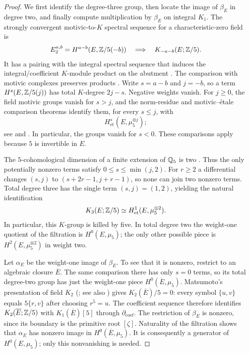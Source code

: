 \begin{proof}
We first identify the degree-three group, then locate the image of
$\beta_E$ in degree two, and finally compute multiplication by
$\beta_E$ on integral $K_1$. The strongly convergent motivic-to-$K$
spectral sequence for a characteristic-zero field is
\begin{equation}\label{eq:motivic}
 E_2^{a,b}=H^{a-b}(E,\mathbb Z/5(-b))
 \quad\Longrightarrow\quad K_{-a-b}(E;\mathbb Z/5).
\end{equation}
It has a pairing with the integral spectral sequence that induces
the integral/coefficient $K$-module product on the abutment
\cite[Theorem 16.2 and Appendix C.2--C.3]{FriedlanderSuslin}.
The comparison with motivic complexes preserves products
\cite[Lemma 3.4 and Theorem 6.1]{Suslin}.
Write $s=a-b$ and $j=-b$, so a term $H^s(E,\mathbb Z/5(j))$ has total
$K$-degree $2j-s$. Negative weights vanish. For $j\geq0$, the
field motivic groups vanish for $s>j$, and the norm-residue and
motivic--\'etale comparison theorems identify them, for every
$s\leq j$, with
\[
 H^s_{\mathrm{et}}(E,\mu_5^{\otimes j});
\]
see \cite[Theorems 6.16--6.17]{Voevodsky} and
\cite[VI.4.1--4.2]{Weibel}. In particular, the groups vanish for
$s<0$. These comparisons apply because $5$ is invertible in $E$.

The $5$-cohomological dimension of a finite extension of $\mathbb Q_5$
is two \cite[VI.\S7, before Proposition 7.3]{Weibel}. Thus the
only potentially nonzero terms satisfy $0\leq s\leq\min(j,2)$.
For $r\geq2$ a differential changes $(s,j)$ to
$(s+2r-1,j+r-1)$, so none can join two nonzero terms. Total
degree three has the single term $(s,j)=(1,2)$, yielding the
natural identification
\begin{equation}\label{eq:degree-three-edge}
 K_3(E;\mathbb Z/5)\simeq H^1_{\mathrm{et}}(E,\mu_5^{\otimes2}).
\end{equation}
In particular, this $K$-group is killed by five. In total degree
two the weight-one quotient of the filtration is $H^0(E,\mu_5)$;
the only other possible piece is $H^2(E,\mu_5^{\otimes2})$ in
weight two.

Let $\alpha_E$ be the weight-one image of $\beta_E$.
To see that it is nonzero, restrict to an algebraic closure
$\overline E$. The same comparison there has only $s=0$ terms,
so its total degree-two group has just the weight-one piece
$H^0(\overline E,\mu_5)$. Matsumoto's presentation of field
$K_2$ (\cite[\S5]{Matsumoto}; see also \cite[III.6.1]{Weibel}) gives
$K_2(\overline E)/5=0$: every symbol
$\{u,v\}$ equals $5\{r,v\}$ after choosing $r^5=u$.
The coefficient sequence therefore identifies
$K_2(\overline E;\mathbb Z/5)$ with $K_1(\overline E)[5]$ through
$\partial_{\mathrm{coef}}$. The restriction of $\beta_E$ is
nonzero, since its boundary is the primitive root $[\zeta]$.
Naturality of the filtration shows that $\alpha_E$ has nonzero
image in $H^0(\overline E,\mu_5)$. It is consequently a generator
of $H^0(E,\mu_5)$; only this nonvanishing is needed.


\end{proof}

